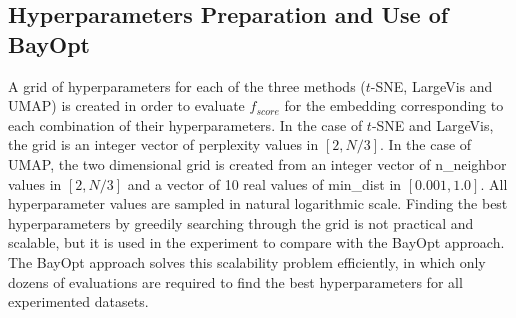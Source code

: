 \subsection{Hyperparameters Preparation and Use of BayOpt}\label{sec:xp:bo}


A grid of hyperparameters for each of the three methods ($t$-SNE, LargeVis and UMAP) is created in order to evaluate $f_{score}$ for the embedding corresponding to each combination of their hyperparameters.
In the case of $t$-SNE and LargeVis, the grid is an integer vector of perplexity values in $[2,N/3]$.
In the case of UMAP, the two dimensional grid is created from an integer vector of {n\_neighbor} values in $[2,N/3]$ and a vector of 10 real values of {min\_dist} in $[0.001, 1.0]$.
All hyperparameter values are sampled in natural logarithmic scale.
Finding the best hyperparameters by greedily searching through the grid is not practical and scalable, but it is used in the experiment to compare with the BayOpt approach.
The BayOpt approach solves this scalability problem efficiently, in which only dozens of evaluations are required to find the best hyperparameters for all experimented datasets.

